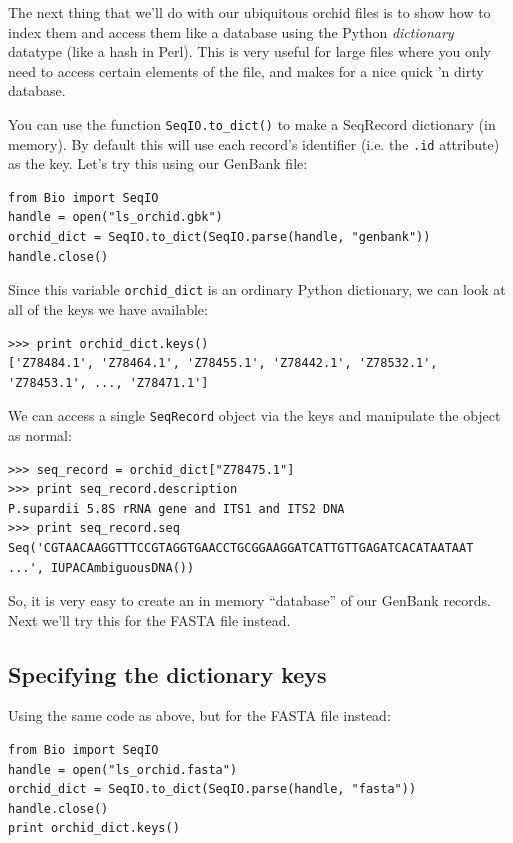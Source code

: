 \documentclass{report}
\begin{document}
The next thing that we'll do with our ubiquitous orchid files is to show how to index them and access them like a database using the Python {\it dictionary} datatype (like a hash in Perl). This is very useful for large files where you only need to access certain elements of the file, and makes for a nice quick 'n dirty database.

You can use the function \verb|SeqIO.to_dict()| to make a SeqRecord dictionary (in memory).  By default this will use each record's identifier (i.e. the \verb|.id| attribute) as the key.  Let's try this using our GenBank file:

\begin{verbatim}
from Bio import SeqIO
handle = open("ls_orchid.gbk")
orchid_dict = SeqIO.to_dict(SeqIO.parse(handle, "genbank"))
handle.close()
\end{verbatim} 

Since this variable \verb|orchid_dict| is an ordinary Python dictionary, we can look at all of the keys we have available:

\begin{verbatim}
>>> print orchid_dict.keys()
['Z78484.1', 'Z78464.1', 'Z78455.1', 'Z78442.1', 'Z78532.1', 'Z78453.1', ..., 'Z78471.1']
\end{verbatim} 

We can access a single \verb|SeqRecord| object via the keys and manipulate the object as normal:

\begin{verbatim}
>>> seq_record = orchid_dict["Z78475.1"]
>>> print seq_record.description
P.supardii 5.8S rRNA gene and ITS1 and ITS2 DNA
>>> print seq_record.seq
Seq('CGTAACAAGGTTTCCGTAGGTGAACCTGCGGAAGGATCATTGTTGAGATCACATAATAAT ...', IUPACAmbiguousDNA())
\end{verbatim}

So, it is very easy to create an in memory ``database'' of our GenBank records.  Next we'll try this for the FASTA file instead.

\subsection{Specifying the dictionary keys}

Using the same code as above, but for the FASTA file instead:

\begin{verbatim}
from Bio import SeqIO
handle = open("ls_orchid.fasta")
orchid_dict = SeqIO.to_dict(SeqIO.parse(handle, "fasta"))
handle.close()
print orchid_dict.keys()
\end{verbatim} 
\end{document}
